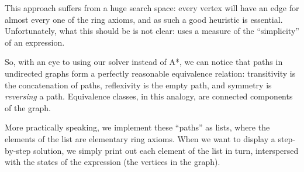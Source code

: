 \documentclass[draft, twocolumn]{article}
\theoremstyle{definition}
\theoremstyle{definition}
\begin{document}
This approach suffers from a huge search space: every vertex will have an edge
for almost every one of the ring axioms, and as such a good heuristic is
essential. Unfortunately, what this should be is not
clear:\cite{lioubartsev_constructing_2016} uses a measure of the ``simplicity''
of an expression.

So, with an eye to using our solver instead of A*, we can notice that paths in
undirected graphs form a perfectly reasonable equivalence relation: transitivity
is the concatenation of paths, reflexivity is the empty path, and symmetry is
\emph{reversing} a path. Equivalence classes, in this analogy, are connected
components of the graph.

More practically speaking, we implement these ``paths'' as lists, where the
elements of the list are elementary ring axioms. When we want to display a
step-by-step solution, we simply print out each element of the list in turn,
interspersed with the states of the expression (the vertices in the graph).
\end{document}
